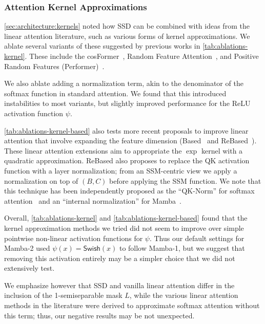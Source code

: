 {\subsubsection{Attention Kernel Approximations}
\label{sec:experiments:ablations:kernels}


\cref{sec:architecture:kernels} noted how SSD can be combined with ideas from the linear attention literature,
such as various forms of kernel approximations.
We ablate several variants of these suggested by previous works in \cref{tab:ablations-kernel}.
These include the cosFormer~\citep{qin2022cosformer}, Random Feature Attention~\cite{peng2021random}, and Positive Random Features (Performer)~\citep{choromanski2021rethinking}.

We also ablate adding a normalization term, akin to the denominator of the softmax function in standard attention.
We found that this introduced instabilities to most variants, but slightly improved performance for the ReLU activation function $\psi$.

\cref{tab:ablations-kernel-based} also tests more recent proposals to improve linear attention that involve expanding the feature dimension (Based~\citep{arora2024simple} and ReBased~\citep{aksenov2024linear}).
These linear attention extensions aim to appropriate the $\exp$ kernel with a quadratic approximation.
ReBased also proposes to replace the QK activation function with a layer normalization;
from an SSM-centric view we apply a normalization on top of $(B, C)$ before applying the SSM function.
We note that this technique has been independently proposed as the ``QK-Norm'' for softmax attention~\citep{team2024chameleon}
and an ``internal normalization'' for Mamba~\citep{lieber2024jamba}.

Overall, \cref{tab:ablations-kernel} and \cref{tab:ablations-kernel-based} found that the kernel approximation methods we tried did not seem to improve over simple pointwise non-linear activation functions for $\psi$.
Thus our default settings for Mamba-2 used $\psi(x) = \mathsf{Swish}(x)$ to follow Mamba-1,
but we suggest that removing this activation entirely may be a simpler choice that we did not extensively test.

We emphasize however that SSD and vanilla linear attention differ in the inclusion of the 1-semiseparable mask $L$, while the various linear attention methods in the literature were derived to approximate softmax attention without this term; thus, our negative results may be not unexpected.

}
